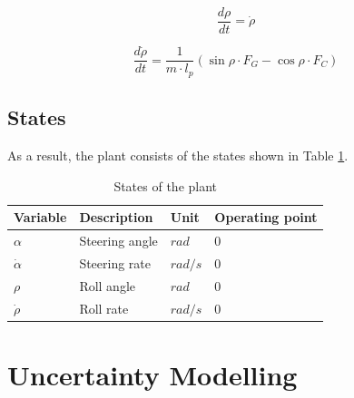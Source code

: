 \documentclass[conference]{IEEEtran}
\begin{document}
\begin{equation}
\frac{{d\rho }}{{dt}} = \dot \rho
\end{equation}

\begin{equation}
\frac{{d\dot \rho }}{{dt}} = \frac{1}{{m \cdot {l_p}}}\left( {\sin \rho  \cdot {F_G} - \cos \rho  \cdot {F_C}} \right)
\end{equation}


\subsection{States}

As a result, the plant consists of the states shown in Table \ref{figure:states}.

\begin{table}[h]
\begin{center}
\begin{tabular}{|l||l|l|l|}
\hline
Variable 		& Description 		& Unit		& Operating point \\
\hline
$\alpha$ 		& Steering angle 	& $rad$	& 0\\
\hline
$\dot \alpha$	& Steering rate 	& $rad/s$	& 0\\
\hline
$\rho$			& Roll angle 		& $rad$	& 0\\
\hline
$\dot \rho$		& Roll rate 		& $rad/s$	& 0\\
\hline
\end{tabular}
\caption{States of the plant}  
\label{figure:states}
\end{center}
\end{table}


\section{Uncertainty Modelling}


%
\end{document}
